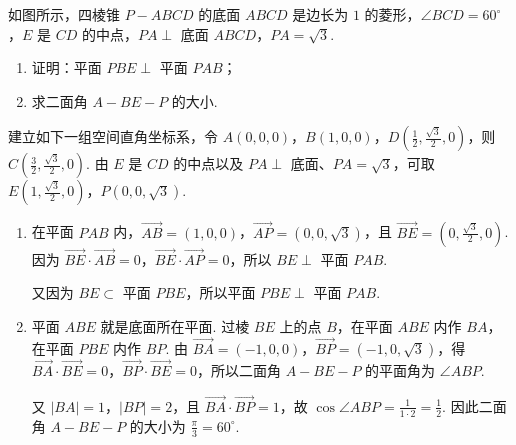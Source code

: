 \begin{problem}
如图所示，四棱锥 \(P-ABCD\) 的底面 \(ABCD\) 是边长为 \(1\) 的菱形，\(\angle BCD = 60^\circ\)，\(E\) 是 \(CD\) 的中点，\(PA \perp\) 底面 \(ABCD\)，\(PA = \sqrt{3}\).

\begin{enumerate}
\item 证明：平面 \(PBE \perp\) 平面 \(PAB\)；
\item 求二面角 \(A - BE - P\) 的大小.
\end{enumerate}


\begin{solution}
建立如下一组空间直角坐标系，令
\(A\left(0,0,0\right)\)，\(B\left(1,0,0\right)\)，\(D\left(\frac{1}{2},\frac{\sqrt{3}}{2},0\right)\)，则
\(C\left(\frac{3}{2},\frac{\sqrt{3}}{2},0\right)\). 由 \(E\) 是 \(CD\) 的中点以及 \(PA\perp\) 底面、\(PA=\sqrt{3}\)，可取
\(E\left(1,\frac{\sqrt{3}}{2},0\right)\)，\(P\left(0,0,\sqrt{3}\right)\).

\begin{enumerate}
\item 在平面 \(PAB\) 内，\(\overrightarrow{AB}=\left(1,0,0\right)\)，\(\overrightarrow{AP}=\left(0,0,\sqrt{3}\right)\)，且
\(\overrightarrow{BE}=\left(0,\frac{\sqrt{3}}{2},0\right)\). 因为
\(\overrightarrow{BE}\cdot\overrightarrow{AB}=0\)，\(\overrightarrow{BE}\cdot\overrightarrow{AP}=0\)，所以 \(BE\perp\) 平面 \(PAB\).

又因为 \(BE\subset\) 平面 \(PBE\)，所以平面 \(PBE\perp\) 平面 \(PAB\).

\item 平面 \(ABE\) 就是底面所在平面. 过棱 \(BE\) 上的点 \(B\)，在平面 \(ABE\) 内作 \(BA\)，在平面 \(PBE\) 内作 \(BP\). 由
\(\overrightarrow{BA}=\left(-1,0,0\right)\)，\(\overrightarrow{BP}=\left(-1,0,\sqrt{3}\right)\)，得
\(\overrightarrow{BA}\cdot\overrightarrow{BE}=0\)，\(\overrightarrow{BP}\cdot\overrightarrow{BE}=0\)，所以二面角 \(A-BE-P\) 的平面角为 \(\angle ABP\).

又 \(|BA|=1\)，\(|BP|=2\)，且 \(\overrightarrow{BA}\cdot\overrightarrow{BP}=1\)，故
\(\cos\angle ABP=\frac{1}{1\cdot2}=\frac{1}{2}\). 因此二面角 \(A-BE-P\) 的大小为 \(\frac{\pi}{3}=60^\circ\).
\end{enumerate}
\end{solution}
\end{problem}

